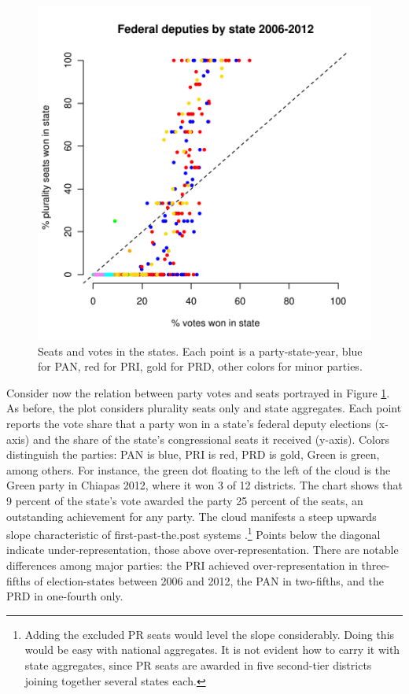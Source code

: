 \documentclass[letter,12pt]{article}
\begin{document}
\begin{figure}
\begin{center}
    \includegraphics[width=.6\columnwidth]{resXedo20062012.pdf} 
\caption{Seats and votes in the states. Each point is a party-state-year, blue for PAN, red for PRI, gold for PRD, other colors for minor parties.}\label{F:seatsVotes}
\end{center}
\end{figure}

Consider now the relation between party votes and seats portrayed in Figure \ref{F:seatsVotes}. As before, the plot considers plurality seats only and state aggregates. Each point reports the vote share that a party won in a state's federal deputy elections (x-axis) and the share of the state's congressional seats it received (y-axis). Colors distinguish the parties: PAN is blue, PRI is red, PRD is gold, Green is green, among others. For instance, the green dot floating to the left of the cloud is the Green party in Chiapas 2012, where it won 3 of 12 districts. The chart shows that 9 percent of the state's vote awarded the party 25 percent of the seats, an outstanding achievement for any party. The cloud manifests a steep upwards slope characteristic of first-past-the.post systems \citep{taagepera.CubeLaw.1973}.\footnote{Adding the excluded PR seats would level the slope considerably. Doing this would be easy with national aggregates. It is not evident how to carry it with state aggregates, since PR seats are awarded in five second-tier districts joining together several states each.} Points below the diagonal indicate under-representation, those above over-representation. There are notable differences among major parties: the PRI achieved over-representation in three-fifths of election-states between 2006 and 2012, the PAN in two-fifths, and the PRD in one-fourth only. 
\end{document}
